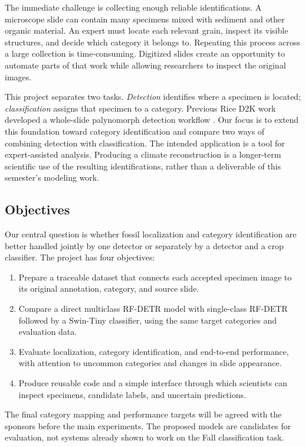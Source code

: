 \documentclass[11pt,letterpaper]{article}
\begin{document}
The immediate challenge is collecting enough reliable identifications. A microscope slide can contain many specimens mixed with sediment and other organic material. An expert must locate each relevant grain, inspect its visible structures, and decide which category it belongs to. Repeating this process across a large collection is time-consuming. Digitized slides create an opportunity to automate parts of that work while allowing researchers to inspect the original images.

This project separates two tasks. \emph{Detection} identifies where a specimen is located; \emph{classification} assigns that specimen to a category. Previous Rice D2K work developed a whole-slide palynomorph detection workflow \citep{shaikh2026}. Our focus is to extend this foundation toward category identification and compare two ways of combining detection with classification. The intended application is a tool for expert-assisted analysis. Producing a climate reconstruction is a longer-term scientific use of the resulting identifications, rather than a deliverable of this semester's modeling work.

\subsection{Objectives}
Our central question is whether fossil localization and category identification are better handled jointly by one detector or separately by a detector and a crop classifier. The project has four objectives:
\begin{enumerate}
\item Prepare a traceable dataset that connects each accepted specimen image to its original annotation, category, and source slide.
\item Compare a direct multiclass RF-DETR model with single-class RF-DETR followed by a Swin-Tiny classifier, using the same target categories and evaluation data.
\item Evaluate localization, category identification, and end-to-end performance, with attention to uncommon categories and changes in slide appearance.
\item Produce reusable code and a simple interface through which scientists can inspect specimens, candidate labels, and uncertain predictions.
\end{enumerate}
The final category mapping and performance targets will be agreed with the sponsors before the main experiments. The proposed models are candidates for evaluation, not systems already shown to work on the Fall classification task.
\end{document}
